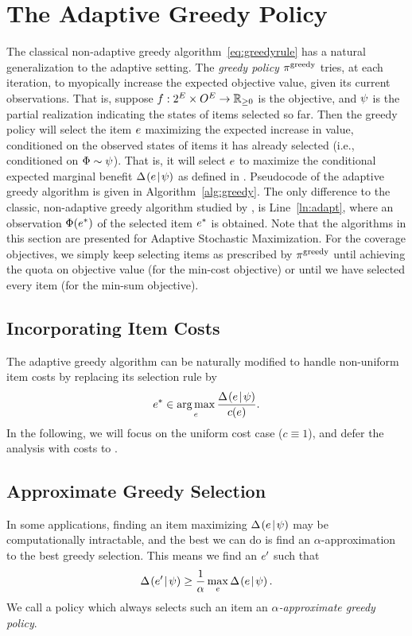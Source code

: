 \section{The Adaptive Greedy Policy} \label{sec:the-greedy-policy}

The classical non-adaptive greedy algorithm~\eqref{eq:greedyrule} has a natural generalization to the adaptive setting.
The \emph{greedy policy} $\pi^{\text{greedy}}$ tries, at each iteration, to
myopically increase the expected objective value, given its current
observations.
That is, suppose 
$f:2^{E} \times O^{E} \to \mathbb{R}_{\ge 0}$ is the objective, and 
 ${\color{black}{\ensuremath{\psi}}}$ is the partial realization indicating the states of items selected so
far. 
Then the greedy policy will select the item $e$ maximizing the
expected increase in value, conditioned on the observed states of
items it has
already selected (i.e., conditioned on ${\color{black}{\ensuremath{\Phi}}}\sim{\color{black}{\ensuremath{\psi}}}$).  That is, it
will select $e$ to maximize the conditional expected
marginal benefit $\Delta \hspace{-0.3mm} \left( { {e}\! \mid \! {{\color{black}{\ensuremath{\psi}}}} } \right)  $ as defined in . 
Pseudocode of the adaptive greedy algorithm is given in
Algorithm~\ref{alg:greedy}.  The only difference to the classic,
non-adaptive greedy algorithm studied by \citet{nemhauser78}, is
Line~\ref{ln:adapt}, where an observation ${\color{black}{\ensuremath{\Phi}}}(e^{*})$ of the
selected item $e^{*}$ is obtained. Note that the algorithms
in this section are presented for Adaptive Stochastic Maximization.
For the coverage objectives, we simply keep selecting items as prescribed by
$\pi^{\text{greedy}}$ until achieving the quota on objective value (for the
min-cost objective) or until we have selected every item (for the
min-sum objective).

\subsection{Incorporating Item Costs}  The adaptive greedy algorithm can be naturally modified
to handle non-uniform item costs by replacing its selection rule by
$$e^{*}\in\mathop{\rm arg\,max}_{e} \frac{\Delta \hspace{-0.3mm} \left( { {e}\! \mid \! {{\color{black}{\ensuremath{\psi}}}} } \right)  }{c(e)}.$$
In the following, we will focus on the uniform cost case
($c \equiv 1$), and defer the analysis with costs to \appendixA.

 \subsection{Approximate Greedy Selection} In some applications, finding an item maximizing
$\Delta \hspace{-0.3mm} \left( { {e}\! \mid \! {{\color{black}{\ensuremath{\psi}}}} } \right)  $ may be computationally
intractable, and the best we can do is find an $\alpha$-approximation
to the best greedy selection.  This means we find an $e'$ such that 
$$\Delta \hspace{-0.3mm} \left( { {e'}\! \mid \! {{\color{black}{\ensuremath{\psi}}}} } \right)   \ge \frac{1}{\alpha} \max_{e}
\Delta \hspace{-0.3mm} \left( { {e}\! \mid \! {{\color{black}{\ensuremath{\psi}}}} } \right)  .$$  We call a policy which always
selects such an item an \emph{$\alpha$-approximate greedy policy}.



